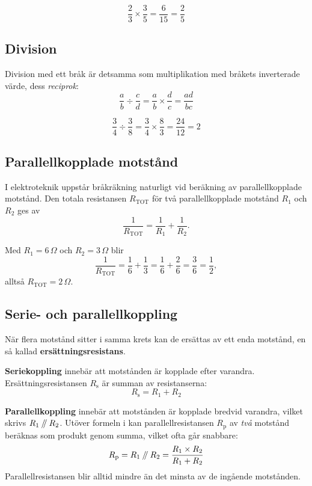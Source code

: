 \begin{exempel}
\[
  \frac{2}{3} \times \frac{3}{5} = \frac{6}{15} = \frac{2}{5}
\]
\end{exempel}

\subsection{Division}
\label{c1:sec:brdiv}
Division med ett bråk är detsamma som multiplikation med bråkets inverterade värde, dess
\emph{reciprok}:
\[
  \frac{a}{b} \div \frac{c}{d} = \frac{a}{b} \times \frac{d}{c} = \frac{ad}{bc}
\]

\begin{exempel}
\[
  \frac{3}{4} \div \frac{3}{8} = \frac{3}{4} \times \frac{8}{3} = \frac{24}{12} = 2
\]
\end{exempel}

\subsection{Parallellkopplade motstånd}
\label{c1:sec:parallell}
I elektroteknik uppstår bråkräkning naturligt vid beräkning av parallellkopplade motstånd. Den
totala resistansen $R_{\text{TOT}}$ för två parallellkopplade motstånd $R_1$ och $R_2$ ges av
\[
  \frac{1}{R_{\text{TOT}}} = \frac{1}{R_1} + \frac{1}{R_2}.
\]

\begin{exempel}
Med $R_1 = 6\,\Omega$ och $R_2 = 3\,\Omega$ blir
\[
  \frac{1}{R_{\text{TOT}}} = \frac{1}{6} + \frac{1}{3} = \frac{1}{6} + \frac{2}{6} = \frac{3}{6}
  = \frac{1}{2},
\]
alltså $R_{\text{TOT}} = 2\,\Omega$.
\end{exempel}

\subsection{Serie- och parallellkoppling}
\label{c1:sec:serieparallell}
När flera motstånd sitter i samma krets kan de ersättas av ett enda motstånd, en så kallad
\textbf{ersättningsresistans}.

\textbf{Seriekoppling} innebär att motstånden är kopplade efter varandra. Ersättningsresistansen
$R_{\text{s}}$ är summan av resistanserna:
\[
  R_{\text{s}} = R_1 + R_2
\]

\textbf{Parallellkoppling} innebär att motstånden är kopplade bredvid varandra, vilket skrivs
$R_1 \mathbin{/\mkern-5mu/} R_2$. Utöver formeln i  kan parallellresistansen
$R_{\text{p}}$ av \emph{två} motstånd beräknas som produkt genom summa, vilket ofta går snabbare:
\[
  R_{\text{p}} = R_1 \mathbin{/\mkern-5mu/} R_2 = \frac{R_1 \times R_2}{R_1 + R_2}
\]
Parallellresistansen blir alltid mindre än det minsta av de ingående motstånden.

